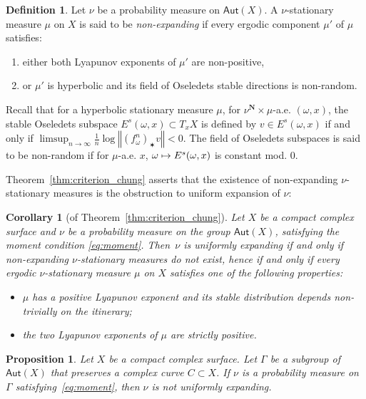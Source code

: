 \documentclass[JEP,XML,SOM,Unicode,published]{cedram}
\newenvironment{enumeratei}
{\bgroup\def\theenumi{\roman{enumi}}\def\theenumii{\arabic{enumii}}\begin{enumerate}}
{\end{enumerate}\egroup}
\newcommand\mto{\mathchoice{\longmapsto}{\mapsto}{\mapsto}{\mapsto}}
\newcommand{\norm}[1]{{\left\Vert#1\right\Vert}}
\newcommand{\unsur}[1]{\frac{1}{#1}}
\def\N{\mathbf{N}}
\newcommand\Aut{\mathsf{Aut}}
\theoremstyle{plain}
\newtheorem{cor}[thm]{Corollary}
\newtheorem{pro}[thm]{Proposition}
\theoremstyle{definition}
\newtheorem{defi}[thm]{Definition}
\begin{document}

\begin{defi}\label{defi:non_expanding_measure}
Let $\nu$ be a probability measure on $\Aut(X)$. A
$\nu$-stationary measure $\mu$ on $X$ is said to be
\emph{non-expanding} if
every ergodic component $\mu'$ of $\mu$ satisfies:
\begin{enumeratei}
\item\label{defi:non_expanding_measurei} either both Lyapunov exponents of $\mu'$ are non-positive,
\item\label{defi:non_expanding_measureii} or $\mu'$ is hyperbolic and its field of Oseledets stable directions is non-random.
\end{enumeratei}
\end{defi}

Recall that for a hyperbolic stationary measure $\mu$, for $\nu^\N\times \mu$-a.e. $(\omega, x)$, the stable Oseledets subspace $E^s(\omega, x)\subset T_xX$ is defined by
$v\in E^s(\omega, x)$ if and only if $\limsup_{n\to\infty} \unsur{n}\log \norm{(f_\omega^n)_\varstar v}<0$. The field of Oseledets subspaces is said to be non-random if for $\mu$-a.e. $x$,
$\omega\mto E^s(\omega, x)$ is constant mod. $0$.

Theorem~\ref{thm:criterion_chung} asserts that the existence
of non-expanding $\nu$-stationary measures is the obstruction to uniform expansion of $\nu$:

\begin{cor}[of Theorem~\ref{thm:criterion_chung}] \label{cor:criterion_chung}
Let $X$ be a compact complex surface and $\nu$ be a probability measure on the group $\Aut(X)$, satisfying the moment condition \eqref{eq:moment}.
Then~$\nu$ is uniformly expanding if
and only if non-expanding $\nu$-stationary measures do not exist, hence
if and only if every ergodic $\nu$-stationary measure $\mu$ on $X$ satisfies one of the following properties:
\begin{itemize}
\item $\mu$ has a positive Lyapunov exponent and its stable distribution depends non-trivially on the itinerary;
\item the two Lyapunov exponents of $\mu$ are strictly positive.
\end{itemize} \end{cor}


\begin{pro}\label{pro:invariant_curve}
Let $X$ be a compact complex surface. Let
$\Gamma$ be a subgroup of $\Aut(X)$ that preserves a complex curve $C\subset X$. If $\nu$ is a probability measure on $\Gamma$ satisfying~\eqref{eq:moment}, then $\nu$ is not uniformly expanding.
\end{pro}
\end{document}
